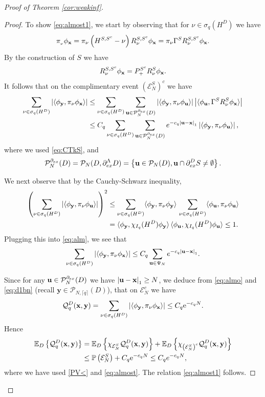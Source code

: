 \documentclass[12pt, a4paper,reqno]{amsart}
\numberwithin{equation}{section}
\newcommand\y{\mathbf{y}}
\newcommand\e{\mathrm{e}}
\renewcommand\P{\mathbb P}
\newcommand\E{\mathbb E}
\newcommand\cE{\mathcal{E}}
\newcommand\cQ{\mathcal{Q}}
\newcommand\cP{\mathcal{P}}
\newcommand\be{\begin{equation}\begin{aligned}}
\newcommand\ee{\end{aligned}\end{equation}}
\newcommand{\abs}[1]{\left\lvert #1 \right\rvert}
\newcommand{\set}[1]{\left\{ #1 \right\}}
\newcommand{\pa}[1]{\left( #1 \right)}
\newcommand{\cl}[1]{\lceil #1 \rceil}
\newcommand\La{\Lambda}
\newcommand{\eq}[1]{\eqref{#1}}
\newcommand{\clq}{\cl{q}}
\begin{document}
\begin{proof}[Proof of  Theorem \ref{cor:weakinf}]
\begin{proof}
To show \eqref{eq:almost1}, we start by observing that for  $\nu \in \sigma_q (H^D)$ we have 
\be
\pi_{_\nu}\phi_{\bf x}=\pi_{\nu}\pa{H^{S,S^c}-\nu}R_\nu^{S,S^c}\phi_{\bf x}=\pi_{\nu}\Gamma^S R_\nu^{S,S^c}\phi_{\bf x}.
\ee
By the construction of $S$ we have
\be
R_\nu^{S,S^c}\phi_{\bf x}=P_+^{S^c}R_\nu^{S}\phi_{\bf x}.
\ee
It follows that on the  complimentary event   $\pa{\cE_N^S}^c $ we have
\be\label{eq:alm}
\sum_{\nu\in\sigma_q(H^D)} \abs{\langle\phi_{\bf y},\pi_{\nu}\phi_{\bf x}\rangle}&\le \sum_{\nu\in\sigma_q(H^D)}\sum_{{\bf u}\in\cP_N^{\partial_{ex}}(D)}\abs{\langle \phi_{\bf y},\pi_{\nu}\phi_{\bf u}\rangle}\abs{\langle \phi_{\bf u},\Gamma^S R_\nu^{S}\phi_{\bf x}\rangle}\\ &\le C_q\sum_{\nu\in\sigma_q(H^D)}\sum_{{\bf u}\in\cP_N^{\partial_{ex}}(D)}e^{-c_q\abs{{\bf u}-{\bf x}}_1}\abs{\langle \phi_{\bf y},\pi_{\nu}\phi_{\bf u}\rangle}, 
\ee
where we used \eq{eq:CTkS}, and  
\be
\cP_N^{\partial_{ex}}(D)=\cP_N(D, \partial_{ex}^\La D) = \set{{\bf u}\in\cP_N(D), {\bf u}\cap\partial_{ex}^D S\neq\emptyset}.
\ee







We next observe that by the Cauchy-Schwarz inequality,
\be\label{eq:CSs}
\pa{\sum_{\nu\in\sigma_q (H^D)}\abs{\langle \phi_{\bf y},\pi_{\nu}\phi_{\bf u}\rangle}}^2 &\le \sum_{\nu\in\sigma_q (H^D)}\langle \phi_{\bf y},\pi_{\nu}\phi_{\bf y}\rangle\,\sum_{\nu\in\sigma_q (H^D)}\langle \phi_{\bf u},\pi_{\nu}\phi_{\bf u}\rangle\\ &= \langle \phi_{\bf y},\chi_{I_{q}}(H^D)\phi_{\bf y}\rangle\, \langle \phi_{\bf u},\chi_{I_{q}}(H^D)\phi_{\bf u}\rangle\le 1.
\ee
Plugging this into \eqref{eq:alm}, we see that
\be\label{eq:almo}
\sum_{\nu\in\sigma_q (H^D) }\abs{\langle\phi_{\bf y},\pi_{\nu}\phi_{\bf x}\rangle}\le C_q\sum_{{\bf u}\in\Psi_N}e^{-c_q \abs{{\bf u}-{\bf x}}_1}.
\ee

Since for any ${\bf u}\in\cP_N^{\partial_{ex}}(D)$ we have 
$\abs{{\bf u}-{\bf x}}_1\ge N$, 
we deduce from \eqref{eq:almo}  and \eqref{eq:d1bn} (recall $\y \in \cP_{N,\clq}(D)$), that on $ \cE_N^c$ we have 
\be\label{eq:almos}
\cQ_q^D ({\bf x},{\bf y})=\sum_{\nu\in\sigma_q (H^D)}\abs{\langle\phi_{\bf y},\pi_{\nu}\phi_{\bf x}\rangle}\le C_q \e^{-c_qN}.
\ee
Hence
\be\label{eq:almost}
\E_D\set{\cQ_q^D ({\bf x},{\bf y})}&=\E_D\set{\chi_{\cE^S_N}\cQ_q^D ({\bf x},{\bf y})}+\E_D\set{\chi_{\pa{\cE_N^S}^c }\cQ_q^D ({\bf x},{\bf y})}  \\&\le \P\pa{\cE_N^S}+C_q\e^{-c_q N}\le C_qe^{-c_qN},
\ee
where we have used \eq{PV<} and  \eqref{eq:almost}. The relation \eqref{eq:almost1} follows.


\end{proof}
\end{proof}
\end{document}
